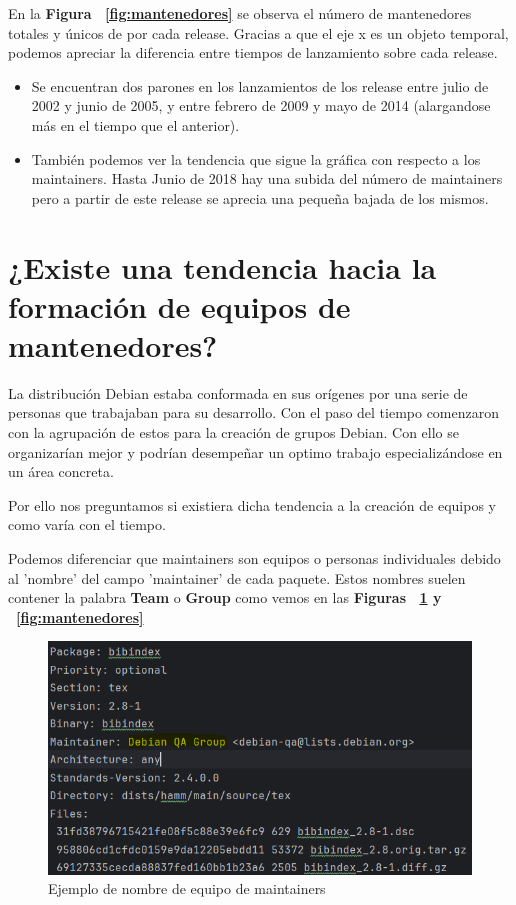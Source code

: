 \documentclass[a4paper, 12pt]{book}
\begin{document}
En la  \textbf{Figura ~\ref{fig:mantenedores}} se observa el número de mantenedores totales y únicos de por cada release. 
Gracias a que el eje x es un objeto temporal, podemos apreciar la diferencia entre tiempos de lanzamiento sobre cada release.
	\begin{itemize}
	\item  Se encuentran dos parones en los lanzamientos de los release entre julio de 2002 y junio de 2005, y entre febrero de 2009 y mayo de 2014 (alargandose más en el tiempo que el anterior).
	
	\item También podemos ver la tendencia que sigue la gráfica con respecto a los maintainers. Hasta Junio de 2018 hay una subida del número de maintainers pero a partir de este release se aprecia una pequeña bajada de los mismos.
\end{itemize}

\section{¿Existe una tendencia hacia la formación de equipos de mantenedores?}
\label{sec:pregunta_2}
La distribución Debian estaba conformada en sus orígenes por una serie de personas que trabajaban para su desarrollo. Con el paso del tiempo comenzaron con la agrupación de estos para la creación de grupos Debian. Con ello se organizarían mejor y podrían desempeñar un optimo trabajo especializándose en un área concreta.


Por ello nos preguntamos si existiera dicha tendencia a la creación de equipos y como varía con el tiempo.

Podemos diferenciar que maintainers son equipos o personas individuales debido al 'nombre' del campo 'maintainer' de cada paquete. Estos nombres suelen contener la palabra \textbf{Team} o \textbf{Group} como vemos en las \textbf{Figuras ~\ref{fig:ejemplo_equipo_1} y ~\ref{fig:mantenedores}}

\begin{figure}
	\centering
	\includegraphics[width=15cm, keepaspectratio]{img/Ejemplo equipo 1.png}
	\caption{Ejemplo de nombre de equipo de maintainers}
	\label{fig:ejemplo_equipo_1}
\end{figure}
\end{document}
